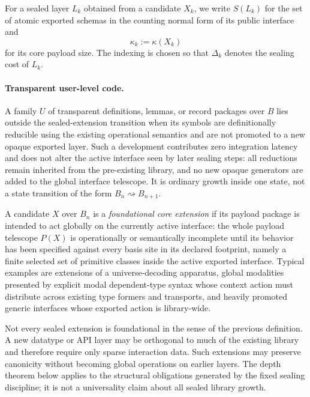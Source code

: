 \documentclass{lmcs}
\begin{document}
For a sealed layer \(L_k\) obtained from a candidate \(X_k\), we write \(S(L_k)\) for the set
of atomic exported schemas in the counting normal form of its public interface and
\[
  \kappa_k := \kappa(X_k)
\]
for its core payload size.  The indexing is chosen so that \(\Delta_k\) denotes the sealing cost
of \(L_k\).

\paragraph{Transparent user-level code.}
A family \(U\) of transparent definitions, lemmas, or record packages over \(B\) lies outside
the sealed-extension transition when its symbols are definitionally reducible using the
existing operational semantics and are not promoted to a new opaque exported layer.  Such a
development contributes zero integration latency and does not alter the active interface seen
by later sealing steps:
all reductions remain inherited from the pre-existing library, and no new opaque generators are
added to the global interface telescope.  It is ordinary growth inside one state, not a state
transition of the form \(B_n\rightsquigarrow B_{n+1}\).

\begin{defi}
A candidate \(X\) over \(B_n\) is a \emph{foundational core extension} if its payload package is
intended to act globally on the currently active interface: the whole payload telescope
\(P(X)\) is operationally or semantically incomplete until its behavior has been specified
against every basis site in its declared footprint, namely a finite selected set of primitive
classes inside the active exported interface.  Typical examples are extensions of a
universe-decoding apparatus, global modalities presented by explicit modal dependent-type
syntax whose context action must distribute across existing type formers and transports, and
heavily promoted generic interfaces whose exported action is library-wide.
\end{defi}

\begin{rem}
\label{rem:sparse-extensions}
Not every sealed extension is foundational in the sense of the previous definition.  A new
datatype or API layer may be orthogonal to much of the existing library and therefore require
only sparse interaction data.  Such extensions may preserve canonicity without becoming
global operations on earlier layers.  The depth theorem below applies to the structural
obligations generated by the fixed sealing discipline; it is not a universality claim about
all sealed library growth.
\end{rem}
\end{document}
